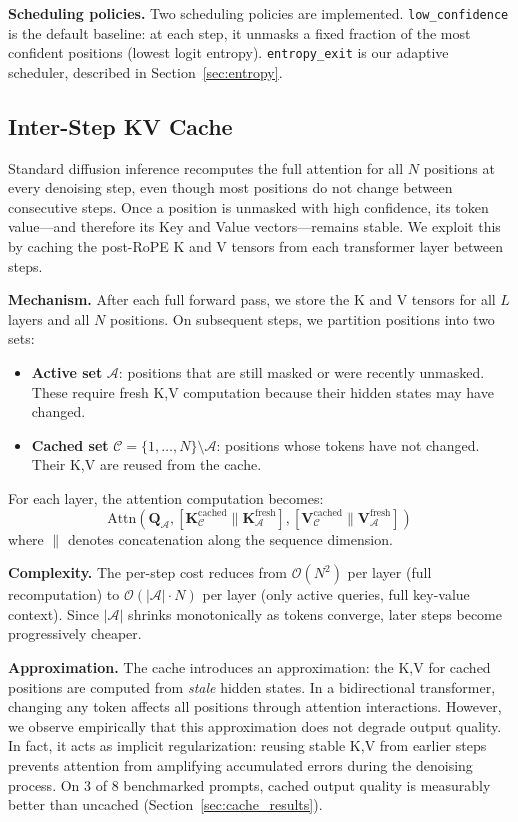\documentclass[11pt]{article}
\begin{document}
\textbf{Scheduling policies.} Two scheduling policies are implemented.
\texttt{low\_confidence} is the default baseline: at each step, it unmasks a fixed
fraction of the most confident positions (lowest logit entropy).
\texttt{entropy\_exit} is our adaptive scheduler, described in
Section~\ref{sec:entropy}.

\subsection{Inter-Step KV Cache}
\label{sec:cache}

Standard diffusion inference recomputes the full attention for all $N$ positions at every
denoising step, even though most positions do not change between consecutive steps. Once
a position is unmasked with high confidence, its token value---and therefore its Key and
Value vectors---remains stable. We exploit this by caching the post-RoPE K and V tensors
from each transformer layer between steps.

\textbf{Mechanism.} After each full forward pass, we store the K and V tensors for all
$L$ layers and all $N$ positions. On subsequent steps, we partition positions into two sets:

\begin{itemize}
\item \textbf{Active set} $\mathcal{A}$: positions that are still masked or were recently
  unmasked. These require fresh K,V computation because their hidden states may have changed.
\item \textbf{Cached set} $\mathcal{C} = \{1,\ldots,N\} \setminus \mathcal{A}$: positions
  whose tokens have not changed. Their K,V are reused from the cache.
\end{itemize}

For each layer, the attention computation becomes:
\[
\text{Attn}(\mathbf{Q}_\mathcal{A}, [\mathbf{K}_\mathcal{C}^{\text{cached}} \| \mathbf{K}_\mathcal{A}^{\text{fresh}}], [\mathbf{V}_\mathcal{C}^{\text{cached}} \| \mathbf{V}_\mathcal{A}^{\text{fresh}}])
\]
where $\|$ denotes concatenation along the sequence dimension.

\textbf{Complexity.} The per-step cost reduces from $\mathcal{O}(N^2)$ per layer
(full recomputation) to $\mathcal{O}(|\mathcal{A}| \cdot N)$ per layer (only active
queries, full key-value context). Since $|\mathcal{A}|$ shrinks monotonically as tokens
converge, later steps become progressively cheaper.

\textbf{Approximation.} The cache introduces an approximation: the K,V for cached
positions are computed from \emph{stale} hidden states. In a bidirectional transformer,
changing any token affects all positions through attention interactions. However, we
observe empirically that this approximation does not degrade output quality. In fact,
it acts as implicit regularization: reusing stable K,V from earlier steps prevents
attention from amplifying accumulated errors during the denoising process. On 3 of 8
benchmarked prompts, cached output quality is measurably better than uncached
(Section~\ref{sec:cache_results}).
\end{document}
